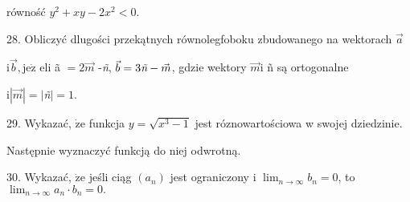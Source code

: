\documentclass[a4paper,12pt]{article}
\begin{document}
równość $y^{2}+xy-2x^{2}<0.$

28. Obliczyć dlugości przekątnych równolegfoboku zbudowanego na wektorach $\vec{a}$

$\mathrm{i} \vec{b}, \mathrm{j}\mathrm{e}\dot{\mathrm{z}}$ eli ã $= 2\vec{m}$ -{\it ñ}, $\vec{b}= 3\text{{\it ñ}}-\vec{m}$, gdzie wektory $\vec{m} \mathrm{i}$ ñ są ortogonalne

$\mathrm{i}|\vec{m}|= |${\it ñ}$| =1.$

29. Wykazać, $\dot{\mathrm{z}}\mathrm{e}$ funkcja $y=\sqrt{x^{3}-1}$ jest róznowartościowa w swojej dziedzinie.

Następnie wyznaczyć funkcją do niej odwrotną.

30. Wykazać, $\dot{\mathrm{z}}\mathrm{e}$ jeśli ciąg $(a_{n})$ jest ograniczony i $\displaystyle \lim_{n\rightarrow\infty}b_{n}=0$, to $\displaystyle \lim_{n\rightarrow\infty}a_{n}\cdot b_{n}=0.$
\end{document}
